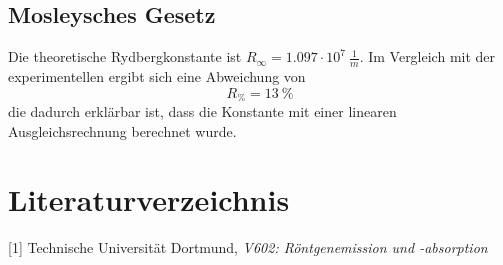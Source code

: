 \subsection{Mosleysches Gesetz}
Die theoretische Rydbergkonstante ist $R_{\infty}=1.097\cdot 10^{7}\ \frac{1}{m}$. Im Vergleich mit der experimentellen ergibt sich eine Abweichung von 
\begin{equation*}
  R_{\%}=13\ \%
\end{equation*}
die dadurch erklärbar ist, dass die Konstante mit einer linearen Ausgleichsrechnung berechnet wurde. 

\section{Literaturverzeichnis}
[1] Technische Universität Dortmund, \textit{V602: Röntgenemission und -absorption}
